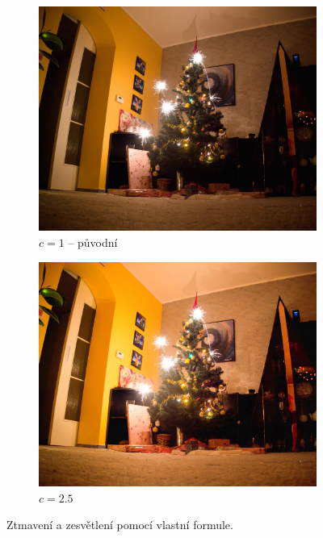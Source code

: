 \documentclass[11pt, a4paper, titlepage]{article}
\begin{document}
\begin{figure}[h]
\begin{subfigure}[t]{0.25\textwidth}
        \includegraphics[width=1.0\textwidth]{tree_original.jpg}
        \caption{$c = 1$ -- původní}
    \end{subfigure}
    \hspace{1cm}
    \begin{subfigure}[t]{0.25\textwidth}
        \vskip 0pt
        \includegraphics[width=1.0\textwidth]{tree_luma_mult_up.jpg}
        \caption{$c = 2.5$}
    \end{subfigure}
    \caption{Ztmavení a zesvětlení pomocí vlastní formule.}
    \label{fig:multiplication-luma}
\end{figure}
\end{document}

